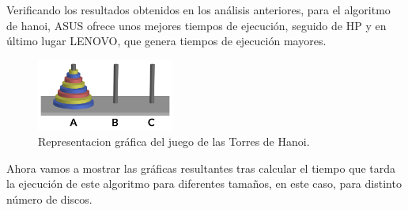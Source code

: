 \documentclass{homework}
\begin{document}
    Verificando los resultados obtenidos en los análisis anteriores, para el algoritmo de hanoi, ASUS ofrece unos mejores 
    tiempos de ejecución, seguido de HP y en último lugar LENOVO, que genera tiempos de ejecución mayores. 

    \begin{figure}[h]
        \centering
        \includegraphics[width=0.4\textwidth]{img/hanoi.png}
        \caption{Representacion gráfica del juego de las Torres de Hanoi.}
    \end{figure}

    Ahora vamos a mostrar las gráficas resultantes tras calcular el tiempo que tarda la ejecución de este algoritmo para diferentes
    tamaños, en este caso, para distinto número de discos.
\end{document}
